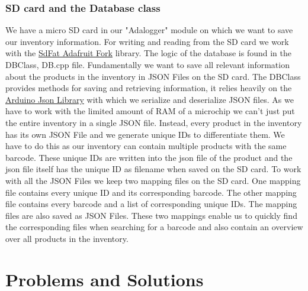 \documentclass{article}
\begin{document}
\subsubsection{SD card and the Database class}
We have a micro SD card in our "Adalogger" module on which we want to save our inventory information.
For writing and reading from the SD card we work with the \href{https://github.com/adafruit/SdFat}{SdFat Adafruit Fork} library.
The logic of the database is found in the DBClass, DB.cpp file. Fundamentally we want to save all relevant information about the products in the inventory in JSON Files on the SD card.
The DBClass provides methods for saving and retrieving information, it relies heavily on the \href{https://github.com/bblanchon/ArduinoJson}{Arduino Json Library} with which we serialize and deserialize JSON files.
As we have to work with the limited amount of RAM of a microchip we can't just put the entire inventory in a single JSON file.
Instead, every product in the inventory has its own JSON File and we generate unique IDs to differentiate them. We have to do this as our inventory can contain multiple products with the same barcode.
These unique IDs are written into the json file of the product and the json file itself has the unique ID as filename when saved on the SD card.
To work with all the JSON Files we keep two mapping files on the SD card. One mapping file contains every unique ID and its corresponding barcode.
The other mapping file contains every barcode and a list of corresponding unique IDs. The mapping files are also saved as JSON Files.
These two mappings enable us to quickly find the corresponding files when searching for a barcode and also contain an overview over all products in the inventory.

\section{Problems and Solutions}
\end{document}
